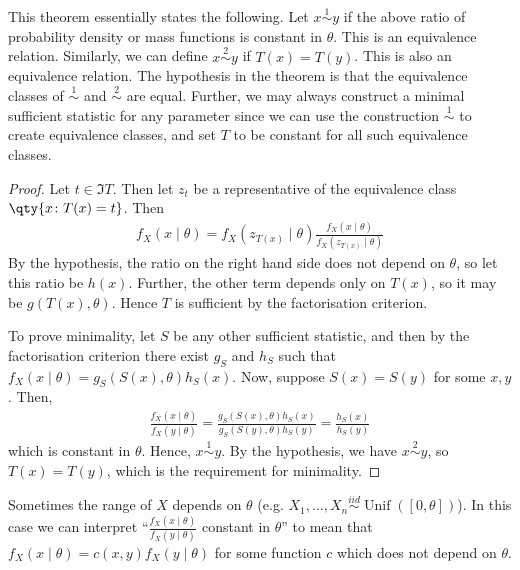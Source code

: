 \begin{remark}
	This theorem essentially states the following.
	Let $x \overset{1}{\sim} y$ if the above ratio of probability density or mass functions is constant in $\theta$.
	This is an equivalence relation.
	Similarly, we can define $x \overset{2}{\sim} y$ if $T(x) = T(y)$.
	This is also an equivalence relation.
	The hypothesis in the theorem is that the equivalence classes of $\overset{1}{\sim}$ and $\overset{2}{\sim}$ are equal.
	Further, we may always construct a minimal sufficient statistic for any parameter since we can use the construction $\overset{1}{\sim}$ to create equivalence classes, and set $T$ to be constant for all such equivalence classes.
\end{remark}
\begin{proof}
	Let $t \in \Im T$.
	Then let $z_t$ be a representative of the equivalence class $\qty{x \colon T(x) = t}$.
	Then
	\begin{align*}
		f_X(x \mid \theta) = f_X(z_{T(x)} \mid \theta) \frac{f_X(x \mid \theta)}{f_X(z_{T(x)} \mid \theta)}
	\end{align*}
	By the hypothesis, the ratio on the right hand side does not depend on $\theta$, so let this ratio be $h(x)$.
	Further, the other term depends only on $T(x)$, so it may be $g(T(x), \theta)$.
	Hence $T$ is sufficient by the factorisation criterion.

	To prove minimality, let $S$ be any other sufficient statistic, and then by the factorisation criterion there exist $g_S$ and $h_S$ such that $f_X(x \mid \theta) = g_S(S(x), \theta) h_S(x)$.
	Now, suppose $S(x) = S(y)$ for some $x, y$.
	Then,
	\begin{align*}
		\frac{f_X(x \mid \theta)}{f_X(y \mid \theta)} = \frac{g_S(S(x), \theta) h_S(x)}{g_S(S(y), \theta) h_S(y)} = \frac{h_S(x)}{h_S(y)}
	\end{align*}
	which is constant in $\theta$.
	Hence, $x \overset{1}{\sim} y$.
	By the hypothesis, we have $x \overset{2}{\sim} y$, so $T(x) = T(y)$, which is the requirement for minimality.
\end{proof}

\begin{remark}
	Sometimes the range of $X$ depends on $\theta$ (e.g. $X_1, \dots, X_n \overset{iid}{\sim}\operatorname{Unif}([0, \theta])$).
	In this case we can interpret ``$\frac{f_X(x \mid \theta)}{f_X(y \mid \theta)}$ constant in $\theta$'' to mean that $f_X(x \mid \theta) = c(x, y) f_X(y \mid \theta)$ for some function $c$ which does not depend on $\theta$.
\end{remark}

